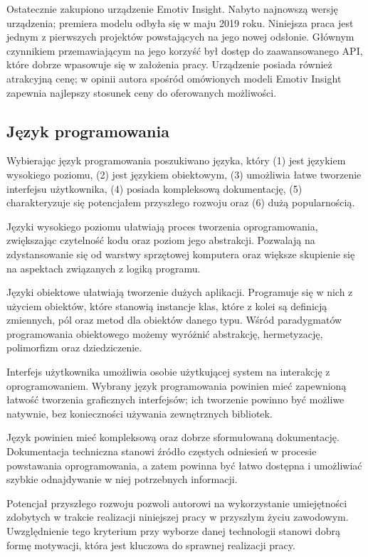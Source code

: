 \documentclass[skorowidz,skroty]{dyplomWEZUT}
\begin{document}
Ostatecznie zakupiono urządzenie Emotiv Insight. Nabyto najnowszą wersję urządzenia; premiera modelu odbyła się w maju 2019 roku. Niniejsza praca jest jednym z pierwszych projektów powstających na jego nowej odsłonie. Głównym czynnikiem przemawiającym na jego korzyść był dostęp do zaawansowanego API, które dobrze wpasowuje się w założenia pracy. Urządzenie posiada również atrakcyjną cenę; w opinii autora spośród omówionych modeli Emotiv Insight zapewnia najlepszy stosunek ceny do oferowanych możliwości.


\subsection{Język programowania}
Wybierając język programowania poszukiwano języka, który (1) jest językiem wysokiego poziomu, (2) jest językiem obiektowym, (3) umożliwia łatwe tworzenie interfejsu użytkownika, (4) posiada kompleksową dokumentację, (5) charakteryzuje się potencjałem przyszłego rozwoju oraz (6) dużą popularnością. 

Języki wysokiego poziomu ułatwiają proces tworzenia oprogramowania, zwiększając czytelność kodu oraz poziom jego abstrakcji. Pozwalają na zdystansowanie się od warstwy sprzętowej komputera oraz większe skupienie się na aspektach związanych z logiką programu.

Języki obiektowe ułatwiają tworzenie dużych aplikacji. Programuje się w nich z użyciem obiektów, które stanowią instancje klas, które z kolei są definicją zmiennych, pól oraz metod dla obiektów danego typu. Wśród paradygmatów programowania obiektowego możemy wyróżnić abstrakcję, hermetyzację, polimorfizm oraz dziedziczenie.

Interfejs użytkownika umożliwia osobie użytkującej system na interakcję z oprogramowaniem. Wybrany język programowania powinien mieć zapewnioną łatwość tworzenia graficznych interfejsów; ich tworzenie powinno być możliwe natywnie, bez konieczności używania zewnętrznych bibliotek. 

Język powinien mieć kompleksową oraz dobrze sformułowaną dokumentację. Dokumentacja techniczna stanowi źródło częstych odniesień w procesie powstawania oprogramowania, a zatem powinna być łatwo dostępna i umożliwiać szybkie odnajdywanie w niej potrzebnych informacji.

Potencjał przyszłego rozwoju pozwoli autorowi na wykorzystanie umiejętności zdobytych w trakcie realizacji niniejszej pracy w przyszłym życiu zawodowym. Uwzględnienie tego kryterium przy wyborze danej technologii stanowi dobrą formę motywacji, która jest kluczowa do sprawnej realizacji pracy.
\end{document}
